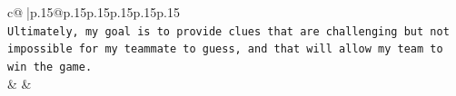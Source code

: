 \documentclass{article}
\begin{document}
{\begin{supertabular}{c@{$\;$}|p{.15\linewidth}@{}p{.15\linewidth}p{.15\linewidth}p{.15\linewidth}p{.15\linewidth}p{.15\linewidth}}
{{{\\ 
\texttt{Ultimately, my goal is to provide clues that are challenging but not impossible for my teammate to guess, and that will allow my team to win the game.} \\
            }
        }
    }
    & & \\ \\

\end{supertabular}
}
\end{document}
